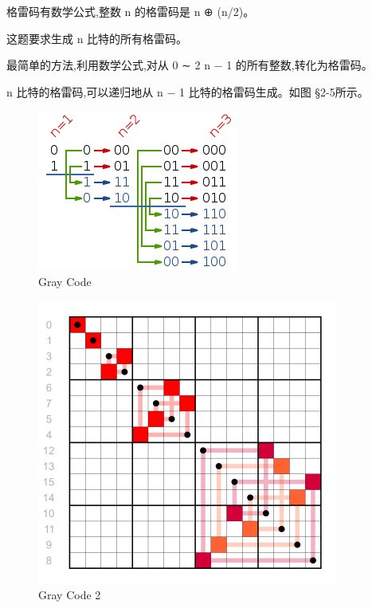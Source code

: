 \documentclass[12pt]{book}
\begin{document}
格雷码有数学公式,整数 n 的格雷码是 n ⊕ (n/2)。

这题要求生成 n 比特的所有格雷码。

最简单的方法,利用数学公式,对从 0 ∼ 2 n − 1 的所有整数,转化为格雷码。

n 比特的格雷码,可以递归地从 n − 1 比特的格雷码生成。如图 §2-5所示。

\begin{figure}[htb]
\centering
\includegraphics[width=.9\linewidth]{./pic/grayCode.png}
\caption{Gray Code}
\end{figure}

\begin{figure}[htb]
\centering
\includegraphics[width=.9\linewidth]{./pic/grayCode2.png}
\caption{Gray Code 2}
\end{figure}
\end{document}
